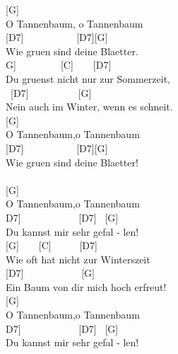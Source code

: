 \documentclass[
  letterpaper,
  twoside=false]{scrbook}
\begin{document}
{[}G{]} ~ ~ ~ ~ ~\\
O Tannenbaum, o Tannenbaum\\
\hspace*{0.333em} {[}D7{]} ~ ~ ~ ~ ~ ~ {[}D7{]}{[}G{]} ~ ~ ~\\
Wie gruen sind deine Blaetter.\\
\hspace*{0.333em}{[}G{]} ~ ~ ~ ~ ~ {[}C{]} ~ ~ {[}D7{]} ~ ~\\
Du gruenst nicht nur zur Sommerzeit,\\
\hspace*{0.333em} ~{[}D7{]} ~ ~ ~ ~ ~ ~{[}G{]} ~ ~\\
Nein auch im Winter, wenn es schneit.\\
{[}G{]} ~ ~ ~\\
O Tannenbaum,o Tannenbaum\\
\hspace*{0.333em} {[}D7{]} ~ ~ ~ ~ ~ ~ {[}D7{]}{[}G{]} ~ ~\\
Wie gruen sind deine Blaetter!\\
\hspace*{0.333em}\\
{[}G{]} ~\\
O Tannenbaum,o Tannenbaum\\
\hspace*{0.333em}{[}D7{]} ~ ~ ~ ~ ~ ~ ~{[}D7{]} ~{[}G{]} ~ ~ ~\\
Du kannst mir sehr gefal - len!\\
\hspace*{0.333em} {[}G{]} ~ ~ {[}C{]} ~ ~ ~ {[}D7{]} ~ ~ ~\\
Wie oft hat nicht zur Winterszeit\\
\hspace*{0.333em} {[}D7{]} ~ ~ ~ ~ ~ ~ ~{[}G{]} ~ ~\\
Ein Baum von dir mich hoch erfreut!\\
{[}G{]} ~\\
O Tannenbaum,o Tannenbaum\\
\hspace*{0.333em}{[}D7{]} ~ ~ ~ ~ ~ ~ ~{[}D7{]} ~{[}G{]} ~ ~\\
Du kannst mir sehr gefal - len!
\end{document}
